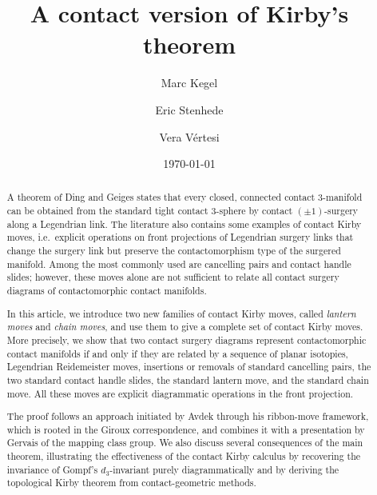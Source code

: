 \documentclass{amsart}
\title{A contact version of Kirby's theorem}
\author{Marc Kegel}
\author{Eric Stenhede}
\author{Vera Vértesi}
\date{\today}
\numberwithin{equation}{section}
\numberwithin{figure}{section}
\theoremstyle{definition}
\theoremstyle{remark}
\begin{document}
\begin{abstract}
A theorem of Ding and Geiges states that every closed, connected contact $3$-manifold can be obtained from the standard tight contact $3$-sphere by contact $(\pm1)$-surgery along a Legendrian link. The literature also contains some examples of contact Kirby moves, i.e.\ explicit operations on front projections of Legendrian surgery links that change the surgery link but preserve the contactomorphism type of the surgered manifold. Among the most commonly used are cancelling pairs and contact handle slides; however, these moves alone are not sufficient to relate all contact surgery diagrams of contactomorphic contact manifolds.

In this article, we introduce two new families of contact Kirby moves, called \emph{lantern moves} and \emph{chain moves}, and use them to give a complete set of contact Kirby moves. More precisely, we show that two contact surgery diagrams represent contactomorphic contact manifolds if and only if they are related by a sequence of planar isotopies, Legendrian Reidemeister moves, insertions or removals of standard cancelling pairs, the two standard contact handle slides, the standard lantern move, and the standard chain move. All these moves are explicit diagrammatic operations in the front projection.

The proof follows an approach initiated by Avdek through his ribbon-move framework, which is rooted in the Giroux correspondence, and combines it with a presentation by Gervais of the mapping class group. We also discuss several consequences of the main theorem, illustrating the effectiveness of the contact Kirby calculus by recovering the invariance of Gompf's $d_3$-invariant purely diagrammatically and by deriving the topological Kirby theorem from contact-geometric methods.
\end{abstract}

\maketitle

\setcounter{tocdepth}{1}

\vspace{-0.6cm}
\end{document}
